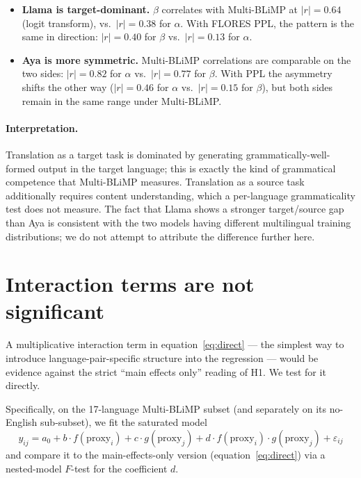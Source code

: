 \documentclass[11pt]{article}
\begin{document}
\begin{itemize}
  \item \textbf{Llama is target-dominant.} $\beta$ correlates with
    Multi-BLiMP at $|r| = 0.64$ (logit transform), vs.\ $|r| = 0.38$
    for $\alpha$. With FLORES PPL, the pattern is the same in
    direction: $|r| = 0.40$ for $\beta$ vs.\ $|r| = 0.13$ for $\alpha$.
  \item \textbf{Aya is more symmetric.} Multi-BLiMP correlations are
    comparable on the two sides: $|r| = 0.82$ for $\alpha$ vs.\ $|r| =
    0.77$ for $\beta$. With PPL the asymmetry shifts the other way
    ($|r| = 0.46$ for $\alpha$ vs.\ $|r| = 0.15$ for $\beta$), but
    both sides remain in the same range under Multi-BLiMP.
\end{itemize}

\paragraph{Interpretation.}
Translation as a target task is dominated by generating
grammatically-well-formed output in the target language; this is
exactly the kind of grammatical competence that Multi-BLiMP measures.
Translation as a source task additionally requires content
understanding, which a per-language grammaticality test does not
measure. The fact that Llama shows a stronger target/source gap than
Aya is consistent with the two models having different multilingual
training distributions; we do not attempt to attribute the difference
further here.

\section{Interaction terms are not significant}
\label{sec:interaction}

A multiplicative interaction term in equation~\eqref{eq:direct} ---
the simplest way to introduce language-pair-specific structure into
the regression --- would be evidence against the strict ``main
effects only'' reading of H1. We test for it directly.

Specifically, on the 17-language Multi-BLiMP subset (and separately
on its no-English sub-subset), we fit the saturated model
\begin{equation}
y_{ij} = a_0 + b \cdot f(\mathrm{proxy}_i) + c \cdot g(\mathrm{proxy}_j)
       + d \cdot f(\mathrm{proxy}_i) \cdot g(\mathrm{proxy}_j)
       + \varepsilon_{ij}
\label{eq:interaction}
\end{equation}
and compare it to the main-effects-only version
(equation~\eqref{eq:direct}) via a nested-model $F$-test for the
coefficient $d$.
\end{document}
